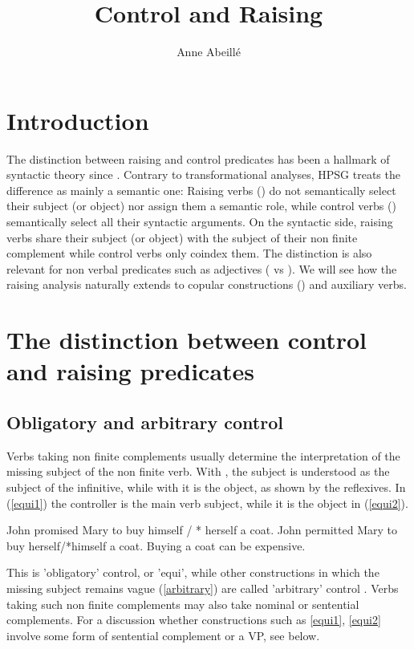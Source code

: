\documentclass[output=paper]{langsci/langscibook}
\author{%
	Anne Abeill\'e\affiliation{Universit\'e de Paris}%
}
\title{Control and Raising}
\begin{document}

\section{Introduction}

The distinction between raising and control predicates has been a hallmark of syntactic theory since \citet{Postal1974}. Contrary to transformational analyses, HPSG treats the difference as mainly a semantic one: Raising verbs () do not semantically select their subject (or object) nor assign them a semantic role, while control verbs () semantically select all their syntactic arguments. On the syntactic side, raising verbs share their subject (or object) with the subject of their non finite complement while control verbs only coindex them. The distinction is also relevant for non verbal predicates such as adjectives ( vs ). We will see how the raising analysis naturally extends to copular constructions () and auxiliary verbs. 



\section{The distinction between control and raising predicates}

\subsection{Obligatory and arbitrary control}

Verbs taking non finite complements usually determine the interpretation of the missing subject of the non finite verb. With , the subject is understood as the subject of the infinitive, while with  it is the object, as shown by the reflexives. In (\ref{equi1}) the controller is the main verb subject, while it is the object in (\ref{equi2}).

	\begin{exe}
	\ex \begin{xlist}
	\ex John promised Mary to buy himself / * herself a coat. \label{equi1}
   \ex 	John permitted Mary to buy herself/*himself a coat.\label{equi2}
 \ex Buying a coat can be expensive.\label{arbitrary}
 \end{xlist}
 \end{exe}

This is 'obligatory' control, or 'equi', while other constructions in which the missing subject remains vague (\ref{arbitrary}) are called 'arbitrary' control \citep{Bresnan1982}.
Verbs taking such non finite complements may also take nominal or sentential complements. For a discussion whether constructions such as \ref{equi1}, \ref{equi2} involve some form of sentential complement or a VP, see below.
\end{document}
